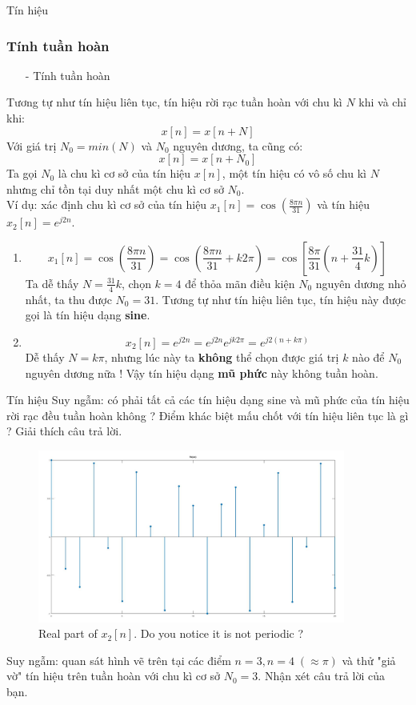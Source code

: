 \documentclass[8pt]{beamer}
\begin{document}
\begin{frame}{Tín hiệu}
\subsubsection{Tính tuần hoàn}
\begin{itemize}
	\item[-] Tính tuần hoàn
\end{itemize}
Tương tự như tín hiệu liên tục, tín hiệu rời rạc tuần hoàn với chu kì $N$ khi và chỉ khi:
$$x[n]=x[n+N]$$
Với giá trị $N_{0}=min(N)$ và $N_{0}$ nguyên dương, ta cũng có:
$$x[n]=x[n+N_{0}]$$
Ta gọi $N_{0}$ là \alert{chu kì cơ sở của tín hiệu $x[n]$}, một tín hiệu có vô số chu kì $N$ nhưng chỉ tồn tại duy nhất một chu kì cơ sở $N_{0}$.
\\ Ví dụ: xác định chu kì cơ sở của tín hiệu $x_{1}[n]=\cos{\left(\frac{8\pi n}{31}\right)}$ và tín hiệu $x_{2}[n]=e^{j2n}$.
\begin{enumerate}
	\item
\begin{equation*}
	x_{1}[n]=\cos{\left(\frac{8\pi n}{31}\right)}=\cos{\left(\frac{8\pi n}{31}+k2\pi\right)}=\cos{\left[\frac{8\pi}{31}\left(n+\frac{31}{4}k\right)\right]}
\end{equation*}
Ta dễ thấy $N=\frac{31}{4}k$, chọn $k=4$ để thỏa mãn điều kiện $N_{0}$ nguyên dương nhỏ nhất, ta thu được $N_{0}=31$. Tương tự như tín hiệu liên tục, tín hiệu này được gọi là tín hiệu dạng \textbf{sine}.
\item 
\begin{equation*}
	x_{2}[n]=e^{j2n}=e^{j2n}e^{jk2\pi}=e^{j2\left(n+k\pi\right)}
\end{equation*}
Dễ thấy $N=k\pi$, nhưng lúc này ta \textbf{không} thể chọn được giá trị $k$ nào để $N_{0}$ nguyên dương nữa ! Vậy tín hiệu dạng \textbf{mũ phức} này không tuần hoàn.
\end{enumerate}
\end{frame}
\begin{frame}{Tín hiệu}
Suy ngẫm: có phải tất cả các tín hiệu dạng sine và mũ phức của tín hiệu rời rạc đều tuần hoàn không ? Điểm khác biệt mấu chốt với tín hiệu liên tục là gì ? Giải thích câu trả lời.
\begin{figure}[h]
			\includegraphics[width=0.9\textwidth]{re.jpg}
			\caption{Real part of $x_{2}[n]$. Do you notice it is \alert{not periodic} ?}			\label{fig:re11}
		\end{figure}
		Suy ngẫm: quan sát hình vẽ trên tại các điểm $n=3,n=4 \; (\approx \pi)$ và thử "giả vờ" tín hiệu trên tuần hoàn với chu kì cơ sở $N_{0}=3$. Nhận xét câu trả lời của bạn.
\end{frame}
\end{document}
